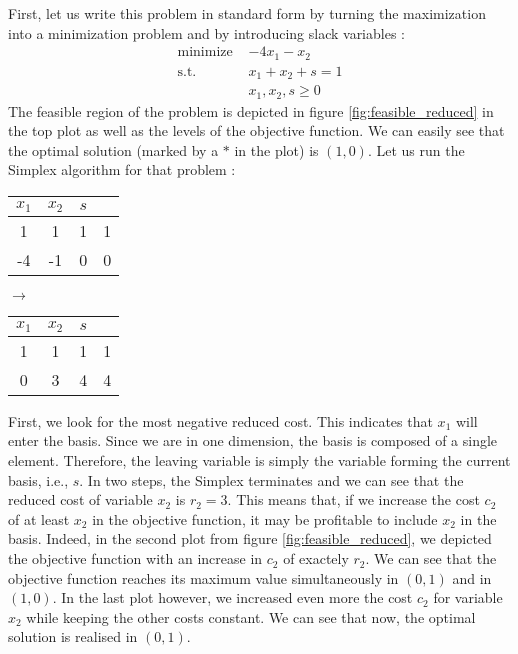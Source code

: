 First, let us write this problem in standard form by turning the maximization into a minimization problem and by introducing slack variables :
\begin{align*}
    \textrm{minimize } & -4x_1 - x_2\\
    \textrm{s.t. } & x_1 + x_2 + s = 1\\
    & x_1, x_2, s\ge 0
\end{align*} The feasible region of the problem is depicted in figure \ref{fig:feasible_reduced} in the top plot as well as the levels of the objective function. We can easily see that the optimal solution (marked by a $*$ in the plot) is $(1,0)$. Let us run the Simplex algorithm for that problem :
\begin{center}
    \begin{tabular}{ccc|c}
        $x_1$ & $x_2$ & $s$ \\\hline
        1 & 1 & 1 & 1\\\hline
        -4 & -1 & 0 & 0
    \end{tabular}
    $\rightarrow$
    \begin{tabular}{ccc|c}
        $x_1$ & $x_2$ & $s$ \\\hline
        1 & 1 & 1 & 1\\\hline
        0 & 3 & 4 & 4
    \end{tabular}
\end{center}
First, we look for the most negative reduced cost. This indicates that $x_1$ will enter the basis. Since we are in one dimension, the basis is composed of a single element. Therefore, the leaving variable is simply the variable forming the current basis, i.e., $s$. In two steps, the Simplex terminates and we can see that the reduced cost of variable $x_2$ is $r_2 = 3$. This means that, if we increase the cost $c_2$ of at least $x_2$ in the objective function, it may be profitable to include $x_2$ in the basis. Indeed, in the second plot from figure \ref{fig:feasible_reduced}, we depicted the objective function with an increase in $c_2$ of exactely $r_2$. We can see that the objective function reaches its maximum value simultaneously in $(0,1)$ and in $(1,0)$. In the last plot however, we increased even more the cost $c_2$ for variable $x_2$ while keeping the other costs constant. We can see that now, the optimal solution is realised in $(0,1)$.

